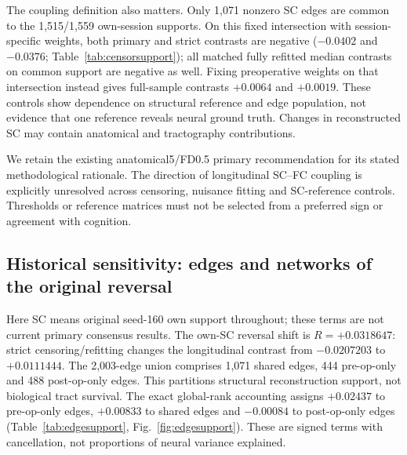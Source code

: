 \documentclass[11pt,a4paper]{article}
\begin{document}
The coupling definition also matters. Only 1,071 nonzero SC edges are common to the 1,515/1,559 own-session supports. On this fixed intersection with session-specific weights, both primary and strict contrasts are negative ($-0.0402$ and $-0.0376$; Table~\ref{tab:censorsupport}); all matched fully refitted median contrasts on common support are negative as well. Fixing preoperative weights on that intersection instead gives full-sample contrasts $+0.0064$ and $+0.0019$. These controls show dependence on structural reference and edge population, not evidence that one reference reveals neural ground truth. Changes in reconstructed SC may contain anatomical and tractography contributions.

\begin{table}[H]\centering\small
\caption{Changing the SC support/reference while leaving FC fixed changes the question. Fixed preoperative SC measures alignment of each FC matrix with one structural reference; own-session SC measures association of each session's reconstructed pair.}\label{tab:censorsupport}\end{table}

We retain the existing anatomical5/FD0.5 primary recommendation for its stated methodological rationale. The direction of longitudinal SC--FC coupling is explicitly unresolved across censoring, nuisance fitting and SC-reference controls. Thresholds or reference matrices must not be selected from a preferred sign or agreement with cognition.

\subsection{Historical sensitivity: edges and networks of the original reversal}\label{sec:edgeresults}
Here SC means original seed-160 own support throughout; these terms are not current primary consensus results. The own-SC reversal shift is $R=+0.0318647$: strict censoring/refitting changes the longitudinal contrast from $-0.0207203$ to $+0.0111444$. The 2,003-edge union comprises 1,071 shared edges, 444 pre-op-only and 488 post-op-only edges. This partitions structural reconstruction support, not biological tract survival. The exact global-rank accounting assigns $+0.02437$ to pre-op-only edges, $+0.00833$ to shared edges and $-0.00084$ to post-op-only edges (Table~\ref{tab:edgesupport}, Fig.~\ref{fig:edgesupport}). These are signed terms with cancellation, not proportions of neural variance explained.
\end{document}
